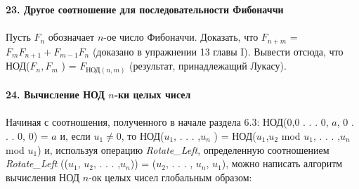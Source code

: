 \noindent\textbf{23. Другое соотношение для последовательности Фибоначчи}\\\\
\hspace*{10pt}Пусть $F_n$ обозначает $n$-ое число Фибоначчи. Доказать, что $F_{n +m}$ =\linebreak
$F_m F_{n+1}+F_{m-1}F_n$ (доказано в упражнении 13 главы I). Вывести отсюда,\linebreak
что НОД($F_n, F_m$ ) = $F_{\text{НОД}(n, m)}$ (результат, принадлежащий Лукасу).\\\\
\noindent\textbf{24. Вычисление НОД $n$-ки целых чисел}\\
\\
\noindent\hspace*{10pt} Начиная с соотношения, полученного в начале раздела 6.3:\linebreak
НОД(0,0 . . . 0, $a$, 0 . . . 0, 0) = $a$ и, если $u_1\neq 0$, то НОД($u_1$, . . . ,$u_n$ ) =\linebreak
НОД($u_1$,$u_2$ mod $u_1$, . . . ,$u_n$ mod $u_1$) и, используя операцию \textit{Rotate\_Left}, \linebreak
определенную соотношением \textit{Rotate\_Left} (($u_1$, $u_2$, . . . ,$u_n$)) = ($u_2$, . . . ,\linebreak
$u_n$, $u_1$), можно написать алгоритм вычисления НОД $n$-ок целых чисел\linebreak
глобальным образом:

